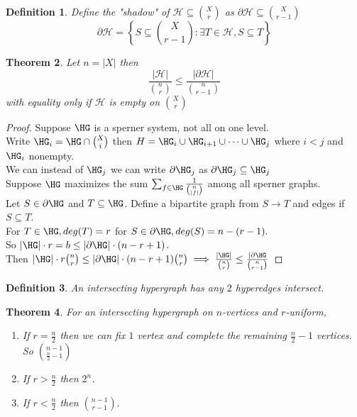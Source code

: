 \documentclass[a4paper]{article}
\newtheorem{thm}{Theorem}[section]
\newtheorem{defn}[thm]{Definition}
\begin{document}
\begin{defn}
    Define the "shadow" of $\mathcal{H}\subseteq { X \choose r}$ as $\partial \mathcal{H}\subseteq {X \choose r-1}$ $$\partial \mathcal{H}=\left \{S\subseteq {X \choose r-1}: \exists T\in \mathcal{H}, S\subseteq T\right \}$$
\end{defn}
\begin{thm}
    Let $n=|X|$ then $$\frac{|\mathcal{H}|}{{n \choose r}}\leq \frac{|\partial \mathcal{H}|}{{n \choose r-1}}$$ with equality only if $\mathcal{H}$ is empty on ${X \choose r}$
\end{thm}
\begin{proof}
    Suppose $\mathcal{\HG}$ is a sperner system, not all on one level.\\
    Write $\HG_i=\HG\cap {X \choose i}$ then $H=\HG_i\cup \HG_{i+1}\cup\cdots\cup \HG_j$ where $i<j$ and $\HG_i$ nonempty.\\
    We can instead of $\HG_j$ we can write $\partial \HG_j$ as $\partial \HG_j\subseteq \HG_j$\\
    Suppose $\HG$ maximizes the sum $\sum_{f\in \HG}\frac{1}{{n \choose |f|}}$ among all sperner graphs. \\
    Let $S\in \partial \HG$ and $T\subseteq \HG$. Define a bipartite graph from $S\to T$ and edges if $S\subseteq T.$ \\
    For $T\in \HG,deg(T)=r$ for $S\in \partial \HG,deg(S)=n-(r-1).$\\ 
    So $|\HG|\cdot r=b\leq |\partial \HG|\cdot(n-r+1)$.\\
    Then $|\HG|\cdot r {n \choose r}\leq |\partial \HG|\cdot(n-r+1) {n \choose r}\implies \frac{|\HG|}{{n \choose r}}\leq \frac{|\partial \HG}{{n \choose r-1}}$ 
\end{proof}
\begin{defn}
    An intersecting hypergraph has any $2$ hyperedges intersect.
\end{defn}
\begin{thm}
    For an intersecting hypergraph on $n$-vertices and $r$-uniform, \begin{enumerate}
        \item[] If $r=\frac{n}{2}$ then we can fix $1$ vertex and complete the remaining $\frac{n}{2}-1$ vertices. So ${n-1 \choose \frac{n}{2}-1}$
        \item[] If $r>\frac{n}{2}$ then $2^n$. 
        \item[] If $r<\frac{n}{2}$ then ${n-1 \choose r-1}.$
    \end{enumerate}
\end{thm}
\end{document}
